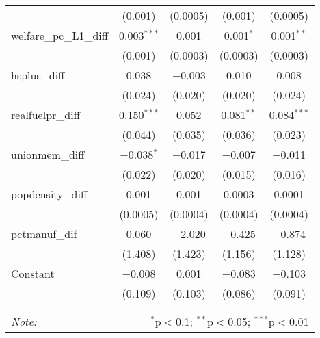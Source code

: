 \begin{table}[!htbp]
\begin{tabular}{@{\extracolsep{5pt}}lcccc}
  & (0.001) & (0.0005) & (0.001) & (0.0005) \\ 
  welfare\_pc\_L1\_diff & 0.003$^{***}$ & 0.001 & 0.001$^{*}$ & 0.001$^{**}$ \\ 
  & (0.001) & (0.0003) & (0.0003) & (0.0003) \\ 
  hsplus\_diff & 0.038 & $-$0.003 & 0.010 & 0.008 \\ 
  & (0.024) & (0.020) & (0.020) & (0.024) \\ 
  realfuelpr\_diff & 0.150$^{***}$ & 0.052 & 0.081$^{**}$ & 0.084$^{***}$ \\ 
  & (0.044) & (0.035) & (0.036) & (0.023) \\ 
  unionmem\_diff & $-$0.038$^{*}$ & $-$0.017 & $-$0.007 & $-$0.011 \\ 
  & (0.022) & (0.020) & (0.015) & (0.016) \\ 
  popdensity\_diff & 0.001 & 0.001 & 0.0003 & 0.0001 \\ 
  & (0.0005) & (0.0004) & (0.0004) & (0.0004) \\ 
  pctmanuf\_dif & 0.060 & $-$2.020 & $-$0.425 & $-$0.874 \\ 
  & (1.408) & (1.423) & (1.156) & (1.128) \\ 
  Constant & $-$0.008 & 0.001 & $-$0.083 & $-$0.103 \\ 
  & (0.109) & (0.103) & (0.086) & (0.091) \\ 
 \hline \\[-1.8ex] 
\hline 
\hline \\[-1.8ex] 
\textit{Note:}  & \multicolumn{4}{r}{$^{*}$p$<$0.1; $^{**}$p$<$0.05; $^{***}$p$<$0.01} \\ 
\end{tabular} 
\end{table} 
